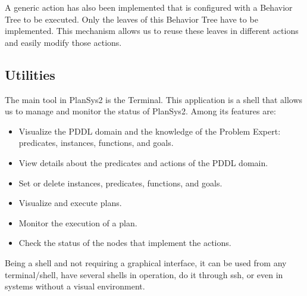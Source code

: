 \documentclass[letterpaper, 10 pt, conference]{IEEEtran}
\begin{document}
A generic action has also been implemented that is configured with a Behavior Tree to be executed. Only the leaves of this Behavior Tree have to be implemented. This mechanism allows us to reuse these leaves in different actions and easily modify those actions.

\subsection{Utilities}

The main tool in PlanSys2 is the Terminal. This application is a shell that allows us to manage and monitor the status of PlanSys2. Among its features are:
\begin{itemize}
    \item Visualize the PDDL domain and the knowledge of the Problem Expert: predicates, instances, functions, and goals.
    \item View details about the predicates and actions of the PDDL domain.
    \item Set or delete instances, predicates, functions, and goals.
    \item Visualize and execute plans.
    \item Monitor the execution of a plan.
    \item Check the status of the nodes that implement the actions.
\end{itemize}

Being a shell and not requiring a graphical interface, it can be used from any terminal/shell, have several shells in operation, do it through ssh, or even in systems without a visual environment.
\end{document}
